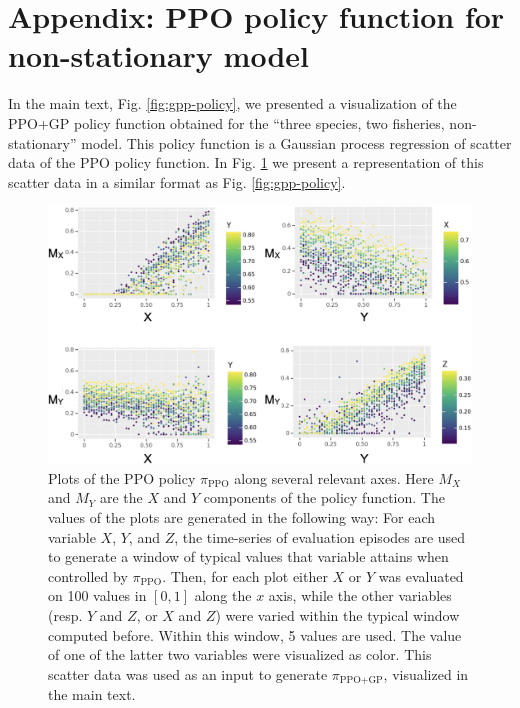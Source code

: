 \documentclass{article}
\begin{document}
\hypertarget{appendix-ppo-policy-function-for-non-stationary-model}{%
\section{Appendix: PPO policy function for non-stationary
model}\label{appendix-ppo-policy-function-for-non-stationary-model}}

In the main text, Fig. \ref{fig:gpp-policy}, we presented a
visualization of the PPO+GP policy function obtained for the ``three
species, two fisheries, non-stationary'' model. This policy function is
a Gaussian process regression of scatter data of the PPO policy
function. In Fig. \ref{fig:ppo-policy} we present a representation of
this scatter data in a similar format as Fig. \ref{fig:gpp-policy}.

\begin{figure}
  \centering
  \includegraphics[scale=0.35]{figures/ppo-policy.jpeg}
  \caption{Plots of the PPO policy $\pi_{\text{PPO}}$ along several relevant axes. Here $M_X$ and $M_Y$ are the $X$ and $Y$ components of the policy function. The values of the plots are generated in the following way: For each variable $X$, $Y$, and $Z$, the time-series of evaluation episodes are used to generate a window of typical values that variable attains when controlled by $\pi_{\text{PPO}}$. Then, for each plot either $X$ or $Y$ was evaluated on 100 values in $[0,1]$ along the $x$ axis, while the other variables (resp. $Y$ and $Z$, or $X$ and $Z$) were varied within the typical window computed before. Within this window, 5 values are used. The value of one of the latter two variables were visualized as color. This scatter data was used as an input to generate $\pi_{\text{PPO+GP}}$, visualized in the main text.}
  \label{fig:ppo-policy}
\end{figure}
\end{document}
